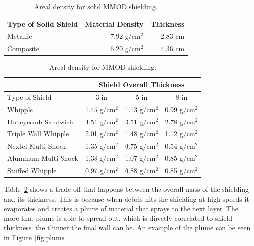 \documentclass[paper=letter, fontsize=11pt]{scrartcl} %
\numberwithin{equation}{section} %
\numberwithin{figure}{section} %
\numberwithin{table}{section} %
\begin{document}
\begin{table}[H]
\begin{centering}
\begin{tabular}{lrr}
\toprule
	Type of Solid Shield & Material Density & Thickness \\
\midrule
	Metallic             & 7.92 g/cm$^2$ & 2.83 cm \\
	Composite            & 6.20 g/cm$^2$ & 4.36 cm \\
\bottomrule
\end{tabular}
\caption{Areal density for solid MMOD shielding.}
\label{table:solidMMOD}
\end{centering}
\end{table}

\begin{table}[H]
\begin{centering}
\begin{tabular}{lccc}
\toprule
                         & \multicolumn{3}{c}{Shield Overall Thickness}  \\
\midrule
	Type of Shield       & 3 in          & 5 in          & 8 in \\ \hline
	Whipple              & 1.45 g/cm$^2$ & 1.13 g/cm$^2$ & 0.99 g/cm$^2$ \\
	Honeycomb Sandwich   & 4.54 g/cm$^2$ & 3.51 g/cm$^2$ & 2.78 g/cm$^2$ \\
	Triple Wall Whipple  & 2.01 g/cm$^2$ & 1.48 g/cm$^2$ & 1.12 g/cm$^2$ \\
	Nextel Multi-Shock   & 1.35 g/cm$^2$ & 0.75 g/cm$^2$ & 0.54 g/cm$^2$ \\
	Aluminum Multi-Shock & 1.38 g/cm$^2$ & 1.07 g/cm$^2$ & 0.85 g/cm$^2$ \\
	Stuffed Whipple      & 0.97 g/cm$^2$ & 0.88 g/cm$^2$ & 0.85 g/cm$^2$ \\
\bottomrule
\end{tabular}
\caption{Areal density for MMOD shielding.}
\label{table:MMOD}
\end{centering}
\end{table}

Table~\ref{table:MMOD} shows a trade off that happens between the overall mass of the shielding and its thickness. This is because when debris hits the shielding at high speeds it evaporates and creates a plume of material that sprays to the next layer. The more that plume is able to spread out, which is directly correlated to shield thickness, the thinner the final wall can be. An example of the plume can be seen in Figure~\ref{fig:plume}.
\end{document}
